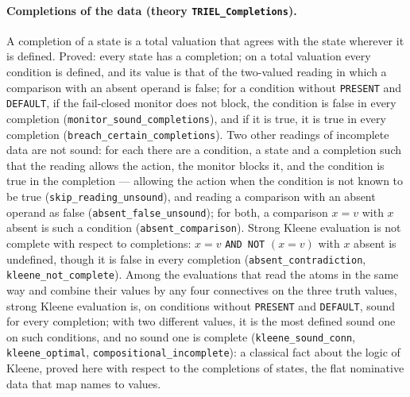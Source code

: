 \documentclass[11pt,a4paper]{article}
\begin{document}
\paragraph{Completions of the data (theory \texttt{TRIEL\_Completions}).}
A completion of a state is a total valuation that agrees with the state wherever it is
defined. Proved: every state has a completion; on a total valuation every condition is
defined, and its value is that of the two-valued reading in which a comparison with an
absent operand is false; for a condition without \texttt{PRESENT} and \texttt{DEFAULT}, if
the fail-closed monitor does not block, the condition is false in every completion
(\texttt{monitor\_sound\_completions}), and if it is true, it is true in every completion
(\texttt{breach\_certain\_completions}). Two other readings of incomplete data are not
sound: for each there are a condition, a state and a completion such that the reading
allows the action, the monitor blocks it, and the condition is true in the completion ---
allowing the action when the condition is not known to be true
(\texttt{skip\_reading\_unsound}), and reading a comparison with an absent operand as false
(\texttt{absent\_false\_unsound}); for both, a comparison $x = v$ with $x$ absent is such a
condition (\texttt{absent\_comparison}). Strong Kleene evaluation is not complete with respect
to completions: $x = v$ \texttt{AND NOT} $(x = v)$ with $x$ absent is undefined, though it is
false in every completion (\texttt{absent\_contradiction}, \texttt{kleene\_not\_complete}).
Among the evaluations that read the atoms in the same way and combine their values by any
four connectives on the three truth values, strong Kleene evaluation is, on conditions
without \texttt{PRESENT} and \texttt{DEFAULT}, sound for every completion; with two
different values, it is the most defined sound one on such conditions, and no sound one is
complete (\texttt{kleene\_sound\_conn}, \texttt{kleene\_optimal},
\texttt{compositional\_incomplete}): a classical fact about the logic of Kleene, proved here
with respect to the completions of states, the flat nominative data that map names to
values.
\end{document}

